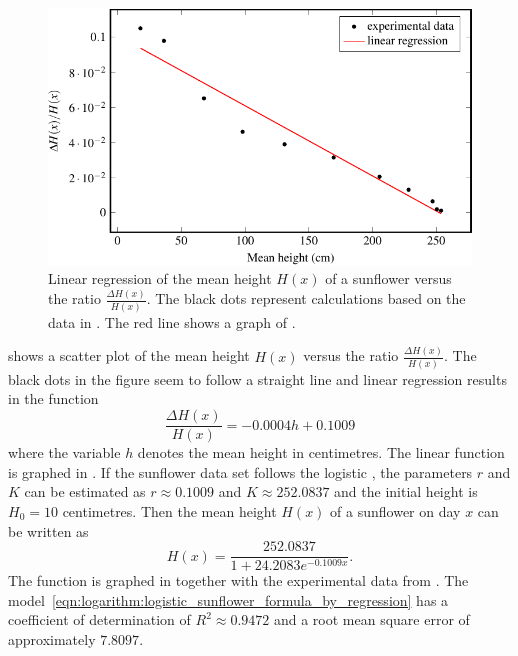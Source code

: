\documentclass[a4paper,oneside,12pt]{article}
\begin{document}
\begin{problem}
{\begin{solution}
\begin{figure}[!htbp]
\centering
\includegraphics[scale=1.1]{image/12/sunflower-regression.pdf}
\caption{%
  Linear regression of the mean height $H(x)$ of a sunflower versus
  the ratio $\frac{\Delta H(x)}{H(x)}$.  The black dots represent
  calculations based on the data in .
  The red line shows a graph of
  .
}
\label{fig:logarithm:logistic_sunflower_regression}
\end{figure}

 shows a scatter
plot of the mean height $H(x)$ versus the ratio
$\frac{\Delta H(x)}{H(x)}$.  The black dots in the figure seem to
follow a straight line and linear regression results in the function
\begin{equation}
\label{eqn:logarithm:logistic_sunflower_regression}
\frac{\Delta H(x)}{H(x)}
=
-0.0004 h + 0.1009
\end{equation}
where the variable $h$ denotes the mean height in centimetres.  The
linear function is graphed in
.  If the
sunflower data set follows the logistic
, the parameters
$r$ and $K$ can be estimated as $r \approx 0.1009$ and
$K \approx 252.0837$ and the initial height is $H_0 = 10$ centimetres.
Then the mean height $H(x)$ of a sunflower on day $x$ can be written
as
\begin{equation}
\label{eqn:logarithm:logistic_sunflower_formula_by_regression}
H(x)
=
\frac{
  252.0837
}{
  1 + 24.2083 e^{-0.1009 x}
}.
\end{equation}
The function is graphed in  together
with the experimental data from .  The
model~\eqref{eqn:logarithm:logistic_sunflower_formula_by_regression}
has a coefficient of determination of $R^2 \approx 0.9472$ and a root
mean square error of approximately $7.8097$.
\end{solution}
}{}
\end{problem}
\end{document}
